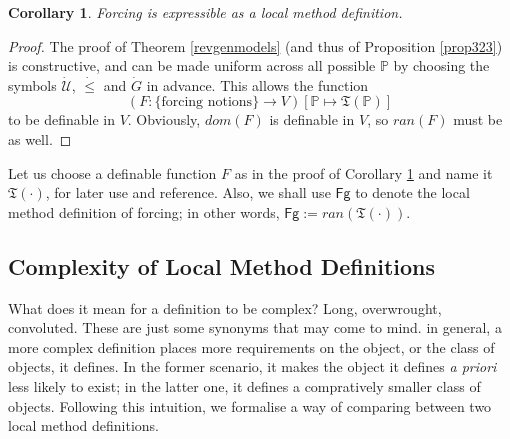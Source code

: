 \documentclass[12pt, twoside]{memoir}
\numberwithin{equation}{section}
\newtheorem{cor}[thm]{Corollary}
\theoremstyle{definition}
\theoremstyle{remark}
\theoremstyle{definition}
\theoremstyle{definition}
\theoremstyle{definition}
\theoremstyle{remark}
\begin{document}
\begin{cor}\label{cor324}
Forcing is expressible as a local method definition.
\end{cor}

\begin{proof}
The proof of Theorem \ref{revgenmodels} (and thus of Proposition \ref{prop323}) is constructive, and can be made uniform across all possible $\mathbb{P}$ by choosing the symbols $\dot{\mathcal{U}}$, $\dot{\leq}$ and $\dot{G}$ in advance. This allows the function 
\begin{equation*}
    (F : \{\text{forcing notions}\} \longrightarrow V) [\mathbb{P} \mapsto \mathfrak{T}(\mathbb{P})]
\end{equation*}
to be definable in $V$. Obviously, $dom(F)$ is definable in $V$, so $ran(F)$ must be as well. 
\end{proof}

Let us choose a definable function $F$ as in the proof of Corollary \ref{cor324} and name it $\mathfrak{T}(\cdot)$, for later use and reference. Also, we shall use $\mathsf{Fg}$ to denote the local method definition of forcing; in other words,  $\mathsf{Fg} := ran(\mathfrak{T}(\cdot))$.

\subsection{Complexity of Local Method Definitions}\label{ss32}

What does it mean for a definition to be complex? Long, overwrought, convoluted. These are just some synonyms that may come to mind. in general, a more complex definition places more requirements on the object, or the class of objects, it defines. In the former scenario, it makes the object it defines \textit{a priori} less likely to exist; in the latter one, it defines a compratively smaller class of objects. Following this intuition, we formalise a way of comparing between two local method definitions.
\end{document}

